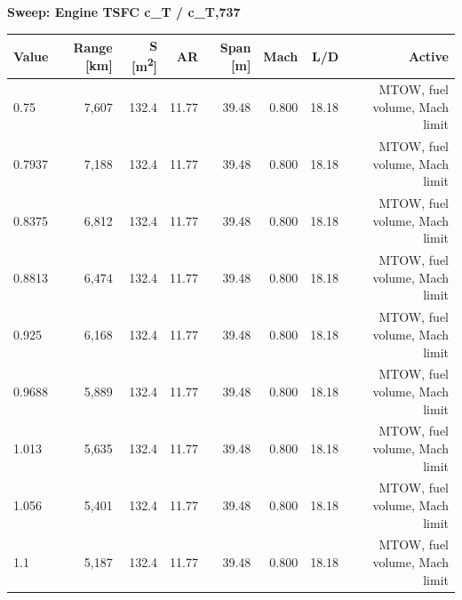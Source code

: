 \documentclass[10pt,a4paper]{article}
\begin{document}
\begin{table}[H]\centering\small
{\textbf{Sweep: Engine TSFC  c\_T / c\_T,737}}\\[3pt]
\begin{tabular}{lrrrrrrr}
\toprule
\textbf{Value} & \textbf{Range [km]} & \textbf{S [m\textsuperscript{2}]} & \textbf{AR} & \textbf{Span [m]} & \textbf{Mach} & \textbf{L/D} & \textbf{Active} \\
\midrule
0.75 & 7,607 & 132.4 & 11.77 & 39.48 & 0.800 & 18.18 & MTOW, fuel volume, Mach limit \\
0.7937 & 7,188 & 132.4 & 11.77 & 39.48 & 0.800 & 18.18 & MTOW, fuel volume, Mach limit \\
0.8375 & 6,812 & 132.4 & 11.77 & 39.48 & 0.800 & 18.18 & MTOW, fuel volume, Mach limit \\
0.8813 & 6,474 & 132.4 & 11.77 & 39.48 & 0.800 & 18.18 & MTOW, fuel volume, Mach limit \\
0.925 & 6,168 & 132.4 & 11.77 & 39.48 & 0.800 & 18.18 & MTOW, fuel volume, Mach limit \\
0.9688 & 5,889 & 132.4 & 11.77 & 39.48 & 0.800 & 18.18 & MTOW, fuel volume, Mach limit \\
1.013 & 5,635 & 132.4 & 11.77 & 39.48 & 0.800 & 18.18 & MTOW, fuel volume, Mach limit \\
1.056 & 5,401 & 132.4 & 11.77 & 39.48 & 0.800 & 18.18 & MTOW, fuel volume, Mach limit \\
1.1 & 5,187 & 132.4 & 11.77 & 39.48 & 0.800 & 18.18 & MTOW, fuel volume, Mach limit \\
\bottomrule
\end{tabular}
\end{table}
\end{document}
